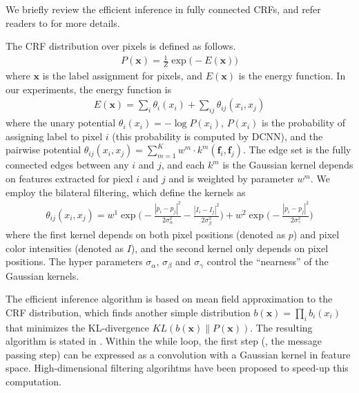 We briefly review the efficient inference in fully connected CRFs, and refer readers to \citep{krahenbuhl2011efficient} for more details. 

The CRF distribution over pixels is defined as follows.
\begin{align}
  P(\boldsymbol{x}) = \frac{1}{Z} \exp \Big(-E(\boldsymbol{x})\Big)
\end{align}
where $\boldsymbol{x}$ is the label assignment for pixels, and $E(\boldsymbol{x})$ is the energy function. In our experiments, the energy function is
\begin{align}
  E(\boldsymbol{x}) = \sum_i \theta_i(x_i) + \sum_{ij} \theta_{ij}(x_i, x_j)
\end{align}
where the unary potential $\theta_i(x_i) = - \log P(x_i)$, $P(x_i)$ is the probability of assigning label to pixel $i$ (this probability is computed by DCNN), and the pairwise potential $\theta_{ij}(x_i, x_j) = \sum_{m=1}^{K} w^m \cdot k^m(\boldsymbol{f}_i, \boldsymbol{f}_j)$. The edge set is the fully connected edges between any $i$ and $j$, and each $k^m$ is the Gaussian kernel depends on features extracted for piexl $i$ and $j$ and is weighted by parameter $w^m$. We employ the bilateral filtering, which define the kernels as 
\begin{align}
  \theta_{ij}(x_i, x_j) = w^1 \exp \Big(-\frac{|p_i-p_j|^2}{2\sigma_\alpha^2} -\frac{|I_i-I_j|^2}{2\sigma_\beta^2} \Big) + w^2 \exp \Big(-\frac{|p_i-p_j|^2}{2\sigma_\gamma^2}\Big)
\end{align}
where the first kernel depends on both pixel positions (denoted as $p$) and pixel color intensities (denoted as $I$), and the second kernel only depends on pixel positions. The hyper parameters $\sigma_\alpha$, $\sigma_\beta$ and $\sigma_\gamma$ control the ``nearness'' of the Gaussian kernels.

The efficient inference algorithm is based on mean field approximation to the CRF distribution, which finds another simple distribution $b(\boldsymbol{x}) = \prod_i b_i(x_i)$ that minimizes the KL-divergence $KL(b(\boldsymbol{x}) \| P(\boldsymbol{x}))$. The resulting algorithm is stated in . Within the while loop, the first step (\ie, the message passing step) can be expressed as a convolution with a Gaussian kernel in feature space. High-dimensional filtering algorihtms \citep{adams2010fast} have been proposed to speed-up this computation.

